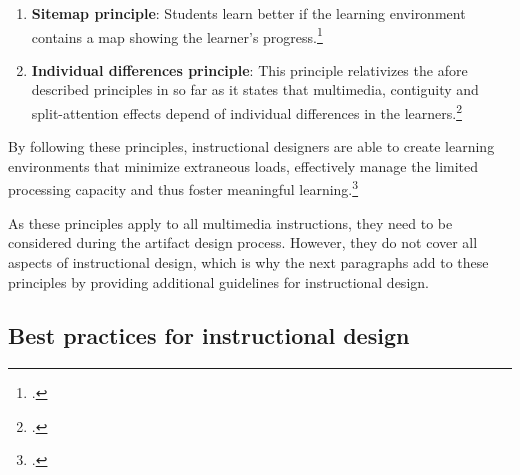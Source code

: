 \begin{enumerate}
    \begin{enumerate}
        \item \textbf{Guided activity:} A pedagogical agent who helps guide students' cognitive processing is helpful for meaningful learning.
        \item \textbf{Reflection}: By asking students to reflect upon answers, the process of sense making is facilitated.
        \item \textbf{Feedback}: Students learn better with explanatory rather than corrective feedback.
        \item \textbf{Pacing}: If allowed to control the pace of presentation of the learning material, students are allowed to adapt the presentation to their processing rate, thus facilitating learning.\footcites[Cf.][p.316]{MorenoInteractiveMultimodalLearning2007}
    \end{enumerate}
    \item \textbf{Sitemap principle}: Students learn better if the learning environment contains a map showing the learner's progress.\footcites[Cf.][p.7]{MayerMultimediaLearning2009}
    \item \textbf{Individual differences principle}: This principle relativizes the afore described principles in so far as it states that multimedia, contiguity and split-attention effects depend of individual differences in the learners.\footcites[Cf.][p.15]{MayerCognitiveTheoryMultimedia1999}
\end{enumerate}
By following these principles, instructional designers are able to create learning environments that minimize extraneous loads, effectively manage the limited processing capacity and thus foster meaningful learning.\footcites[Cf.][chapter 2, paragraph 6]{ClarkElearningscienceinstruction2016}

As these principles apply to all multimedia instructions, they need to be considered during the artifact design process. However, they do not cover all aspects of instructional design, which is why the next paragraphs add to these principles by providing additional guidelines for instructional design.

\subsection{Best practices for instructional design} \label{subsec:BestPracticesDesign}

